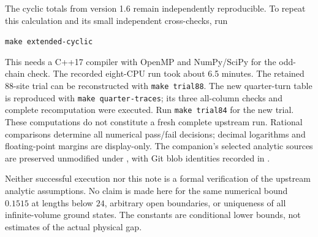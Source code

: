 \documentclass[11pt,a4paper]{article}
\begin{document}
The cyclic totals from version 1.6 remain independently reproducible.
To repeat this calculation and its small independent cross-checks, run
\begin{center}
\texttt{make extended-cyclic}
\end{center}
This needs a C++17 compiler with OpenMP and
NumPy/SciPy for the odd-chain check. The recorded eight-CPU run took
about 6.5 minutes. The retained 88-site trial can be reconstructed with
\texttt{make trial88}. The new quarter-turn table is reproduced with \texttt{make quarter-traces};
its three all-column checks and complete recomputation were executed.
Run \texttt{make trial84} for the new trial. These computations do not
constitute a fresh complete upstream run.
Rational comparisons determine all numerical pass/fail decisions;
decimal logarithms and floating-point margins are display-only.
The companion's selected analytic sources are preserved unmodified
under , with Git blob identities recorded
in .

Neither successful execution nor this note is a formal verification of
the upstream analytic assumptions. No claim is made here for the same
numerical bound $0.1515$ at lengths below $24$, arbitrary open boundaries, or
uniqueness of all infinite-volume ground states. The constants are conditional lower
bounds, not estimates of the actual physical gap.
\end{document}
